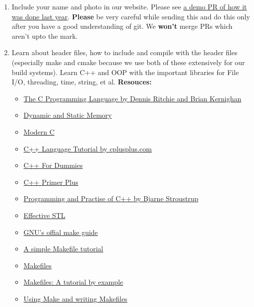 \documentclass{article}
\begin{document}
\begin{enumerate}
\item Include your name and photo in our website. Please see \href{https://github.com/Swarm-IITKgp/Swarm-IITKgp.github.io/pull/36/files}{a demo PR of how it was done last year}.
{\newline}{\newline}
{\bf Please} be very careful while sending this and do this only after you have a good understanding of git. We {\bf won't} merge PRs which aren't upto the mark.

\item Learn about header files, how to include and compile with the header files (especially make and cmake because we use both of these extensively for our build systems). Learn C++ and OOP with the important libraries for File I/O, threading, time, string, et al.{\newline}{\newline}
{\bf Resouces:}

    \begin{itemize}
        \item \href{https://drive.google.com/open?id=0B79CUUbZuqcbWE1VMFl2LW9yTHc}{The C Programming Language by Dennis Ritchie and Brian Kernighan}
        \item \href{https://drive.google.com/open?id=0B79CUUbZuqcbaFZQZ0o0cDVfUnc}{Dynamic and Static Memory}
        \item \href{https://drive.google.com/open?id=0B79CUUbZuqcbdzNyNVFpZUVZNEU}{Modern C}
        \item \href{https://drive.google.com/open?id=0B79CUUbZuqcbOTU2R0VqZmhFYm8}{C++ Language Tutorial by cplusplus.com}
        \item \href{https://drive.google.com/open?id=0B79CUUbZuqcbWks4NTczcGxMalU}{C++ For Dummies}
        \item \href{https://drive.google.com/open?id=0B79CUUbZuqcbY3hjSTVoVFJKWVE}{C++ Primer Plus}
        \item \href{https://drive.google.com/open?id=0B79CUUbZuqcbcXpHeHliYVVMa00}{Programming and Practise of C++ by Bjarne Stroustrup}
        \item \href{https://drive.google.com/open?id=0B79CUUbZuqcbRXk2cDRYd01HMkU}{Effective STL}
        \item \href{http://www.gnu.org/software/make/manual/make.html}{GNU's offial make guide}
        \item \href{http://www.cs.colby.edu/maxwell/courses/tutorials/maketutor/}{A simple Makefile tutorial}
        \item \href{http://www.cs.umd.edu/class/fall2002/cmsc214/Tutorial/makefile.html}{Makefiles}
        \item \href{http://mrbook.org/blog/tutorials/make/}{Makefiles: A tutorial by example}
        \item \href{https://www.cs.swarthmore.edu/~newhall/unixhelp/howto_makefiles.html}{Using Make and writing Makefiles}
    \end{itemize}


\end{enumerate}
\end{document}
